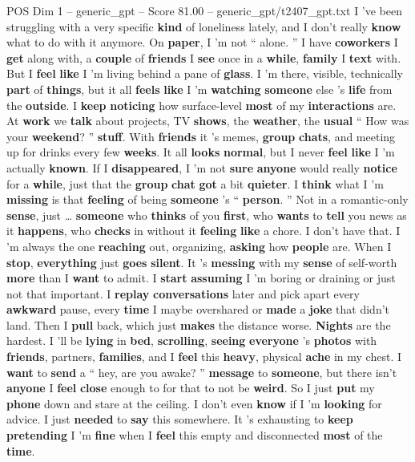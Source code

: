 \begin{textsample}{POS Dim 1 – generic\_gpt – Score 81.00 – generic\_gpt/t2407\_gpt.txt}  \label{ex:f1_pos_009}
I ’ve been struggling with a very specific \textbf{kind} of loneliness lately, and I don't really \textbf{know} what to do with it anymore.
On \textbf{paper}, I ’m not “ alone. ” I have \textbf{coworkers} I \textbf{get} along with, a \textbf{couple} of \textbf{friends} I \textbf{see} once in a \textbf{while}, \textbf{family} I \textbf{text} with.
But I \textbf{feel} \textbf{like} I ’m living behind a pane of \textbf{glass}.
I ’m there, visible, technically \textbf{part} of \textbf{things}, but it all \textbf{feels} \textbf{like} I ’m \textbf{watching} \textbf{someone} else ’s \textbf{life} from the \textbf{outside}.
I \textbf{keep} \textbf{noticing} how surface-level \textbf{most} of my \textbf{interactions} are.
At \textbf{work} we \textbf{talk} about projects, TV \textbf{shows}, the \textbf{weather}, the \textbf{usual} “ How was your \textbf{weekend}? ” \textbf{stuff}.
With \textbf{friends} it ’s memes, \textbf{group} \textbf{chats}, and meeting up for drinks every few \textbf{weeks}.
It all \textbf{looks} \textbf{normal}, but I never \textbf{feel} \textbf{like} I ’m actually \textbf{known}.
If I \textbf{disappeared}, I ’m not \textbf{sure} \textbf{anyone} would really \textbf{notice} for a \textbf{while}, just that the \textbf{group} \textbf{chat} \textbf{got} a bit \textbf{quieter}.
I \textbf{think} what I ’m \textbf{missing} is that \textbf{feeling} of being \textbf{someone} ’s “ \textbf{person}. ” Not in a romantic-only \textbf{sense}, just … \textbf{someone} who \textbf{thinks} of you \textbf{first}, who \textbf{wants} to \textbf{tell} you news as it \textbf{happens}, who \textbf{checks} in without it \textbf{feeling} \textbf{like} a chore.
I don't have that.
I ’m always the one \textbf{reaching} out, organizing, \textbf{asking} how \textbf{people} are.
When I \textbf{stop}, \textbf{everything} just \textbf{goes} \textbf{silent}.
It ’s \textbf{messing} with my \textbf{sense} of self-worth \textbf{more} than I \textbf{want} to admit.
I \textbf{start} \textbf{assuming} I ’m boring or draining or just not that important.
I \textbf{replay} \textbf{conversations} later and pick apart every \textbf{awkward} pause, every \textbf{time} I maybe overshared or \textbf{made} a \textbf{joke} that didn't land.
Then I \textbf{pull} back, which just \textbf{makes} the distance worse. \textbf{Nights} are the hardest.
I ’ll be \textbf{lying} in \textbf{bed}, \textbf{scrolling}, \textbf{seeing} \textbf{everyone} ’s \textbf{photos} with \textbf{friends}, partners, \textbf{families}, and I \textbf{feel} this \textbf{heavy}, physical \textbf{ache} in my chest.
I \textbf{want} to \textbf{send} a “ hey, are you awake? ” \textbf{message} to \textbf{someone}, but there isn't \textbf{anyone} I \textbf{feel} \textbf{close} enough to for that to not be \textbf{weird}.
So I just \textbf{put} my \textbf{phone} down and stare at the ceiling.
I don't even \textbf{know} if I ’m \textbf{looking} for advice.
I just \textbf{needed} to \textbf{say} this somewhere.
It ’s exhausting to \textbf{keep} \textbf{pretending} I ’m \textbf{fine} when I \textbf{feel} this empty and disconnected \textbf{most} of the \textbf{time}.


\end{textsample}
